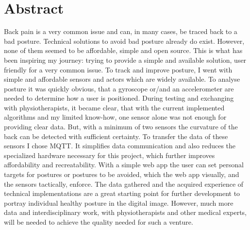 \chapter*{Abstract}
\label{chap:Abstract}
\renewcommand{\thesection}{\arabic{section}}
\setcounter{section}{0}
Back pain is a very common issue and can, in many cases, be traced back to a bad posture. Technical solutions to avoid bad posture already do exist. However, none of them seemed to be affordable, simple and open source. This is what has been inspiring my journey: trying to provide a simple and available solution, user friendly for a very common issue.\newline
To track and improve posture, I went with simple and affordable sensors and actors which are widely available. To analyse posture it was quickly obvious, that a gyroscope or/and an accelerometer are needed to determine how a user is positioned. During testing and exchanging with physiotherapists, it became clear, that with the current implemented algorithms and my limited know-how, one sensor alone was not enough for providing clear data. But, with a minimum of two sensors the curvature of the back can be detected with sufficient certainty. To transfer the data of these sensors I chose MQTT. It simplifies data communication and also reduces the specialized hardware necessary for this project, which further improves affordability and recreatability. With a simple web app the user can set personal targets for postures or postures to be avoided, which the web app visually, and the sensors tactically, enforce.\newline
The data gathered and the acquired experience of technical implementations are a great starting point for further development to portray individual healthy posture in the digital image. However, much more data and interdisciplinary work, with physiotherapists and other medical experts, will be needed to achieve the quality needed for such a venture.


